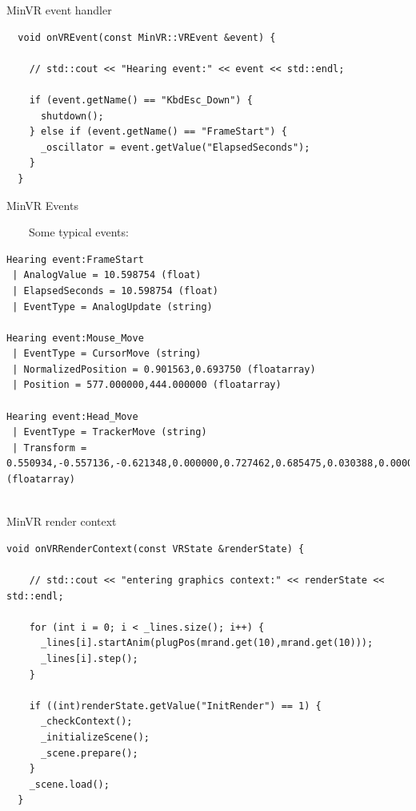 \documentclass[12pt]{article}
\begin{document}
\begin{frame}[fragile]{MinVR event handler}

\begin{Verbatim}
  void onVREvent(const MinVR::VREvent &event) {

    // std::cout << "Hearing event:" << event << std::endl;

    if (event.getName() == "KbdEsc_Down") {
      shutdown();
    } else if (event.getName() == "FrameStart") {
      _oscillator = event.getValue("ElapsedSeconds");
    }
  }
\end{Verbatim}
\end{frame}


\begin{frame}[fragile]{MinVR Events}

~~~~Some typical events:

\begin{Verbatim}[fontsize=\footnotesize]
Hearing event:FrameStart
 | AnalogValue = 10.598754 (float)
 | ElapsedSeconds = 10.598754 (float)
 | EventType = AnalogUpdate (string)

Hearing event:Mouse_Move
 | EventType = CursorMove (string)
 | NormalizedPosition = 0.901563,0.693750 (floatarray)
 | Position = 577.000000,444.000000 (floatarray)

Hearing event:Head_Move
 | EventType = TrackerMove (string)
 | Transform = 0.550934,-0.557136,-0.621348,0.000000,0.727462,0.685475,0.030388,0.000000,0.408... (floatarray)


\end{Verbatim}
\end{frame}

\begin{frame}[fragile]{MinVR render context}

\begin{Verbatim}[fontsize=\small]
  void onVRRenderContext(const VRState &renderState) {

    // std::cout << "entering graphics context:" << renderState << std::endl;

    for (int i = 0; i < _lines.size(); i++) {
      _lines[i].startAnim(plugPos(mrand.get(10),mrand.get(10)));
      _lines[i].step();
    }

    if ((int)renderState.getValue("InitRender") == 1) {
      _checkContext();
      _initializeScene();
      _scene.prepare();
    }
    _scene.load();
  }
\end{Verbatim}
\end{frame}
\end{document}
